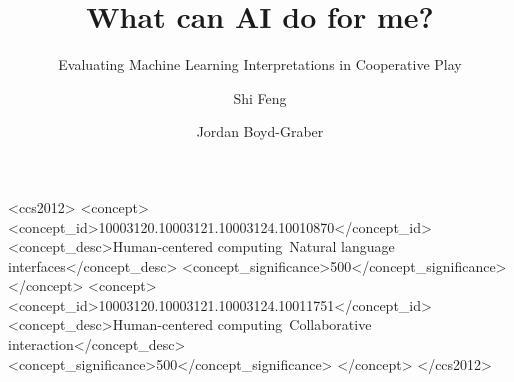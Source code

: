 \documentclass[sigconf]{acmart}
\begin{document}
\title{What can AI do for me?}
\subtitle{Evaluating Machine Learning Interpretations in Cooperative Play}

\author{Shi Feng}

\author{Jordan Boyd-Graber}

\newcommand\BibTeX{B{\sc ib}\TeX}
\newcommand{\qb}[0]{Quizbowl}
\newcommand{\abr}[1]{\textsc{#1}}
\newcommand{\vis}[1]{\emph{#1}}
\newcommand{\etal}[0]{\emph{et al.}}
\newcommand{\ai}[0]{\textsc{ai}}

\newif\ifcomment\commentfalse
\ifcomment
 \newcommand{\jbgcomment}[1]{ \colorbox{red}{   \parbox{.8\linewidth}{ JBG: #1}  }}
 \newcommand{\fscomment}[1]{ \colorbox{green}{   \parbox{.8\linewidth}{ fs: #1}  }}
\else
\newcommand{\jbgcomment}[1]{}
\newcommand{\fscomment}[1]{}
\fi


\begin{abstract}

\end{abstract}

%
%
\begin{CCSXML}
<ccs2012>
<concept>
<concept_id>10003120.10003121.10003124.10010870</concept_id>
<concept_desc>Human-centered computing~Natural language interfaces</concept_desc>
<concept_significance>500</concept_significance>
</concept>
<concept>
<concept_id>10003120.10003121.10003124.10011751</concept_id>
<concept_desc>Human-centered computing~Collaborative interaction</concept_desc>
<concept_significance>500</concept_significance>
</concept>
</ccs2012>
\end{CCSXML}



\maketitle
\end{document}
